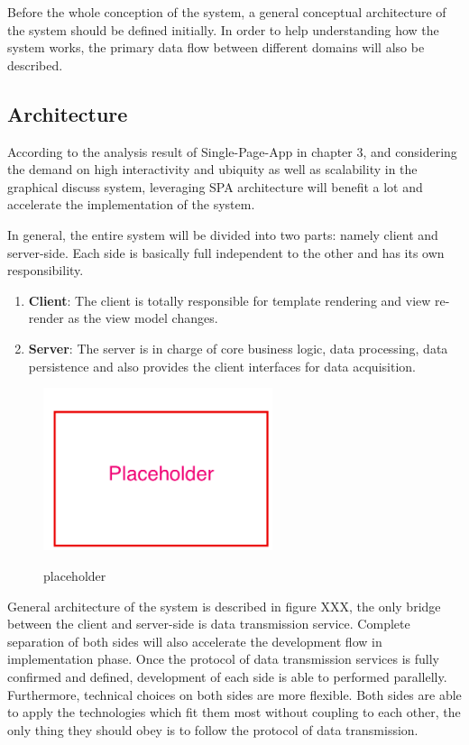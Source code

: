 Before the whole conception of the system, a general conceptual architecture of the system should be defined initially. In order to help understanding how the system works, the primary data flow between different domains will also be described.

\subsection{Architecture} \label{Architecture}
According to the analysis result of Single-Page-App in chapter 3, and considering the demand on high interactivity and ubiquity as well as scalability in the graphical discuss system, leveraging SPA architecture will benefit a lot and accelerate the implementation of the system. 

In general, the entire system will be divided into two parts: namely client and server-side. Each side is basically full independent to the other and has its own responsibility. 

\begin{enumerate}
\item
\textbf{Client}: The client is totally responsible for template rendering and view re-render as the view model changes. 
\item
\textbf{Server}: The server is in charge of core business logic, data processing, data persistence and also provides the client interfaces for data acquisition.
\end{enumerate}

\begin{figure}[!htbp]
  \caption{placeholder}
  \centering
    \includegraphics[width=0.6\textwidth]{Figures/placeholder.png}
  \label{fig:placeholder}
\end{figure}

General architecture of the system is described in figure XXX, the only bridge between the client and server-side is data transmission service. Complete separation of both sides will also accelerate the development flow in implementation phase. Once the protocol of data transmission services is fully confirmed and defined, development of each side is able to performed parallelly. Furthermore, technical choices on both sides are more flexible. Both sides are able to apply the technologies which fit them most without coupling to each other, the only thing they should obey is to follow the protocol of data transmission.

